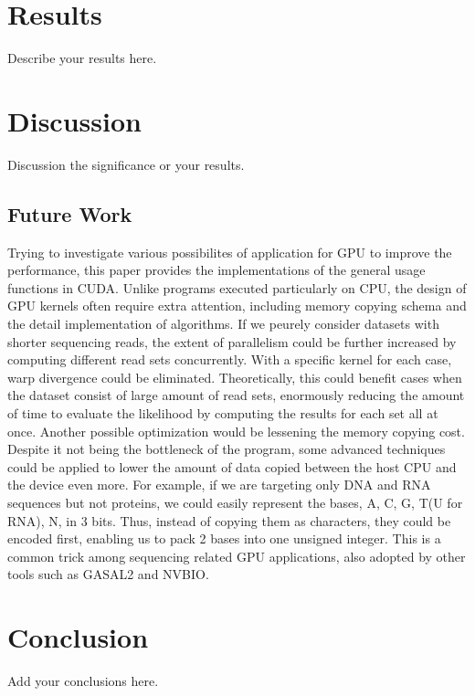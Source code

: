 \documentclass{PHlab-thesis}
\begin{document}
\chapter{Results}
Describe your results here.


\chapter{Discussion}
Discussion the significance or your results.


\section{Future Work}
Trying to investigate various possibilites of application for GPU to improve the performance, this paper provides the implementations of the general usage functions in CUDA. Unlike programs executed particularly on CPU, the design of GPU kernels often require extra attention, including memory copying schema and the detail implementation of algorithms. If we peurely consider datasets with shorter sequencing reads, the extent of parallelism could be further increased by computing different read sets concurrently. With a specific kernel for each case, warp divergence could be eliminated. Theoretically, this could benefit cases when the dataset consist of large amount of read sets, enormously reducing the amount of time to evaluate the likelihood by computing the results for each set all at once. Another possible optimization would be lessening the memory copying cost. Despite it not being the bottleneck of the program, some advanced techniques could be applied to lower the amount of data copied between the host CPU and the device even more. For example, if we are targeting only DNA and RNA sequences but not proteins, we could easily represent the bases, A, C, G, T(U for RNA), N, in 3 bits. Thus, instead of copying them as characters, they could be encoded first, enabling us to pack 2 bases into one unsigned integer. This is a common trick among sequencing related GPU applications, also adopted by other tools such as GASAL2 and NVBIO.

\chapter{Conclusion}
Add your conclusions here.


\newpage
{}
\printbibliography
\end{document}
